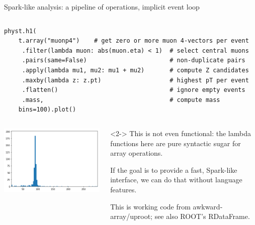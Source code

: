 \documentclass[aspectratio=169]{beamer}
\begin{document}
\begin{frame}[fragile]{Spark-like analysis: a pipeline of operations, implicit event loop}
\small
\begin{columns}
\begin{verbatim}
physt.h1(
    t.array("muonp4")    # get zero or more muon 4-vectors per event
     .filter(lambda muon: abs(muon.eta) < 1)  # select central muons
     .pairs(same=False)                       # non-duplicate pairs
     .apply(lambda mu1, mu2: mu1 + mu2)       # compute Z candidates
     .maxby(lambda z: z.pt)                   # highest pT per event
     .flatten()                               # ignore empty events
     .mass,                                   # compute mass
    bins=100).plot()
\end{verbatim}
\end{columns}

\vspace{0.25 cm}
\begin{columns}
\includegraphics[width=\linewidth]{zpeak.png}

\begin{uncoverenv}<2->
\normalsize
\hspace{-0.15 cm}This is not even functional: the lambda functions here are pure syntactic sugar for array operations.

\vspace{0.25 cm}
If the goal is to provide a fast, Spark-like interface, we can do that without language features.

\vspace{0.25 cm}
This is working code from awkward-array/uproot; see also ROOT's RDataFrame.

\mbox{ }
\end{uncoverenv}
\end{columns}
\end{frame}
\end{document}
